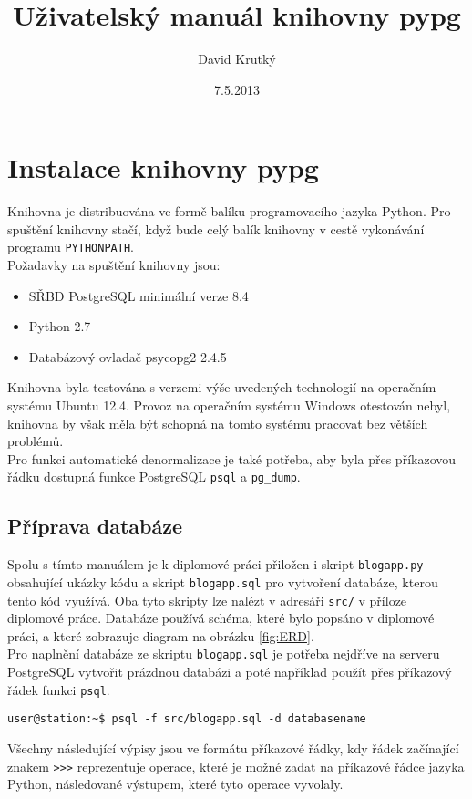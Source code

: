 \documentclass[11pt]{article}
\title{Uživatelský manuál knihovny pypg}
\date{7.5.2013}
\author{David Krutký}
\begin{document}
         
\maketitle

\section{Instalace knihovny pypg}

Knihovna je distribuována ve formě balíku programovacího jazyka Python. Pro spuštění knihovny stačí, když bude celý balík knihovny v cestě vykonávání programu \lstinline[style=inline]|PYTHONPATH|. \\
Požadavky na spuštění knihovny jsou:
\begin{itemize}
\item SŘBD PostgreSQL minimální verze 8.4
\item Python 2.7
\item Databázový ovladač psycopg2 2.4.5
\end{itemize}
Knihovna byla testována s verzemi výše uvedených technologií na operačním systému Ubuntu 12.4. Provoz na operačním systému Windows otestován nebyl, knihovna by však měla být schopná na tomto systému pracovat bez větších problémů. \\
Pro funkci automatické denormalizace je také potřeba, aby byla přes příkazovou řádku dostupná funkce PostgreSQL \lstinline[style=inline]|psql| a \lstinline[style=inline]|pg_dump|.
\subsection{Příprava databáze}
Spolu s tímto manuálem je k diplomové práci přiložen i skript \lstinline[style=inline]|blogapp.py| obsahující ukázky kódu a skript \lstinline[style=inline]|blogapp.sql| pro vytvoření databáze, kterou tento kód využívá. Oba tyto skripty lze nalézt v adresáři \lstinline[style=inline]|src/| v příloze diplomové práce. Databáze používá schéma, které bylo popsáno v diplomové práci, a které zobrazuje diagram na obrázku \ref{fig:ERD}. \\
Pro naplnění databáze ze skriptu \lstinline[style=inline]|blogapp.sql| je potřeba nejdříve na serveru PostgreSQL vytvořit prázdnou databázi a poté například použít přes příkazový řádek funkci \lstinline[style=inline]|psql|. 
\begin{lstlisting}[style=python]
user@station:~$ psql -f src/blogapp.sql -d databasename
\end{lstlisting}
Všechny následující výpisy jsou ve formátu příkazové řádky, kdy řádek začínající znakem \lstinline[style=inline]|>>>| reprezentuje operace, které je možné zadat na příkazové řádce jazyka Python, následované výstupem, které tyto operace vyvolaly.
\end{document}
